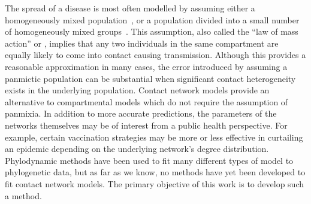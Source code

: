 The spread of a disease is most often modelled by assuming either a
homogeneously mixed population~\autocite{hamer1906milroy,
kermack1927contribution}, or a population divided into a small number of
homogeneously mixed groups~\autocite{rushton1955deterministic}. This
assumption, also called the ``law of mass action'' or , implies
that any two individuals in the same compartment are equally likely to come
into contact causing transmission. Although this provides a reasonable
approximation in many cases, the error introduced by assuming a panmictic
population can be substantial when significant contact heterogeneity exists in
the underlying population. Contact network models provide an alternative to
compartmental models which do not require the assumption of panmixia. In
addition to more accurate predictions, the parameters of the networks
themselves may be of interest from a public health perspective. For example,
certain vaccination strategies may be more or less effective in curtailing an
epidemic depending on the underlying network's degree distribution.
Phylodynamic methods have been used to fit many different types of model to
phylogenetic data, but as far as we know, no methods have yet been developed to
fit contact network models. The primary objective of this work is to develop
such a method.

\newcommand{\G}{\mathcal{G}}
\newcommand{\Nu}{\mathcal{N}}


